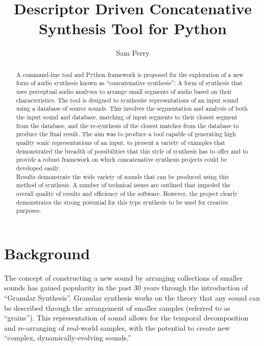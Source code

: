 \documentclass{scrartcl}
\begin{document}
    \title{Descriptor Driven Concatenative Synthesis Tool for Python}
    \author{Sam Perry}

    \maketitle

    \begin{abstract} 
    A command-line tool and Python framework is proposed for the exploration of
    a new form of audio synthesis known as ``concatenative synthesis'': A
    form of synthesis that uses perceptual audio analyses to arrange small
    segments of audio based on their characteristics.  The tool is designed to
    synthesise representations of an input sound using a database of source
    sounds. This involves the segmentation and analysis of both the input sound
    and database, matching of input segments to their closest segment from the
    database, and the re-synthesis of the closest matches from the database to
    produce the final result. The aim was to produce a tool capable of
    generating high quality sonic representations of an input, to present a
    variety of examples that demonstrated the breadth of possibilities that
    this style of synthesis has to offer and to provide a robust framework on
    which concatenative synthesis projects could be developed easily.\\

    Results demonstrate the wide variety of sounds that can be produced using
    this method of synthesis. A number of technical issues are outlined that
    impeded the overall quality of results and efficiency of the software.
    However, the project clearly demonstrates the strong potential for this
    type synthesis to be used for creative purposes.
    \end{abstract}

    \section*{Background}
    The concept of constructing a new sound by arranging collections of smaller
    sounds has gained popularity in the past 30 years through the introduction
    of ``Granular Synthesis''. Granular synthesis works on the theory that any
    sound can be described through the arrangement of smaller samples (referred
    to as ``grains''). This representation of sound allows for the temporal
    decomposition and re-arranging of real-world samples, with the potential to
    create new ``complex, dynamically-evolving
    sounds.''~\parencite[p.1]{Roads1988}\\
\end{document}
